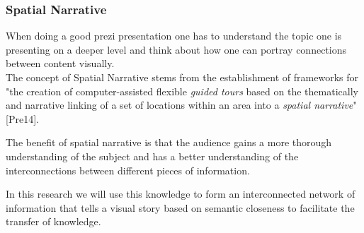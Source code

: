 \begin{frame}
  \frametitle{Spatial Narrative}
  \begin{module}[id=spatialNarrative]

When doing a good prezi presentation one has to understand the topic one is presenting on a deeper level and think about how one can portray connections between content visually.\\

The concept of Spatial Narrative stems from the establishment of frameworks for "the creation of computer-assisted flexible \textit{guided tours} based on the thematically and narrative linking of a set of locations within an area into a \textit{spatial narrative}" [Pre14].

The benefit of spatial narrative is that the audience gains a more thorough understanding of the subject and has a better understanding of the interconnections between different pieces of information. 

In this research we will use this knowledge to form an interconnected network of information that tells a visual story based on semantic closeness to facilitate the transfer of knowledge.\\

  \end{module}
\end{frame}
